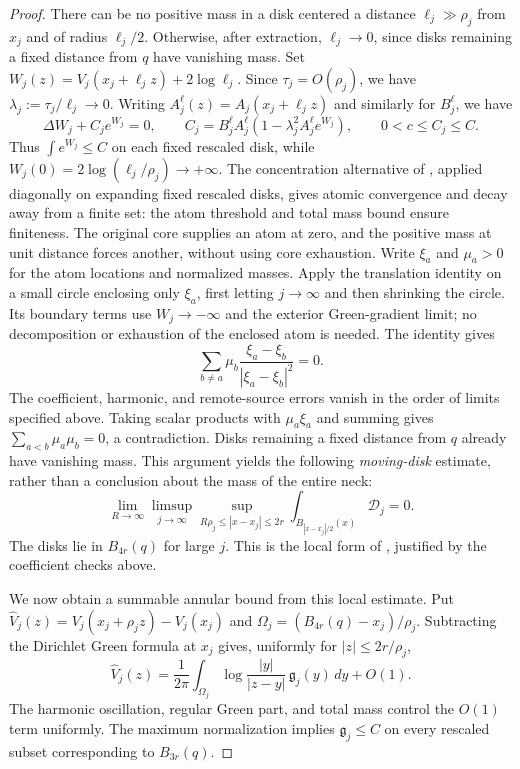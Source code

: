 \documentclass[11pt,reqno]{amsart}
\numberwithin{equation}{section}
\theoremstyle{definition}
\theoremstyle{remark}
\begin{document}
\begin{proof}
There can be no positive mass in a disk centered a distance
$\ell_j\gg\rho_j$ from $x_j$ and of radius $\ell_j/2$.
Otherwise, after extraction, $\ell_j\to0$, since disks remaining
a fixed distance from $q$ have vanishing mass. Set
\(W_j(z)=V_j(x_j+\ell_jz)+2\log\ell_j.\)
Since $\tau_j=O(\rho_j)$, we have $\lambda_j:=\tau_j/\ell_j\to0$.
Writing $A_j^\ell(z)=A_j(x_j+\ell_jz)$ and similarly for $B_j^\ell$, we have
\[
 \Delta W_j+C_je^{W_j}=0,\qquad
 C_j=B_j^\ell A_j^\ell(1-\lambda_j^2A_j^\ell e^{W_j}),
 \qquad 0<c\le C_j\le C.
\]
Thus $\int e^{W_j}\le C$ on each fixed rescaled disk, while
$W_j(0)=2\log(\ell_j/\rho_j)\to+\infty$.
The concentration alternative of \cite[Theorem~3]{BM}, applied
diagonally on expanding fixed rescaled disks, gives atomic convergence
and decay away from a finite set: the atom threshold and total mass
bound ensure finiteness. The original core supplies an atom at zero,
and the positive mass at unit distance forces another, without using
core exhaustion. Write $\xi_a$ and $\mu_a>0$ for the atom locations
and normalized masses. Apply the translation identity on a small
circle enclosing only $\xi_a$, first letting $j\to\infty$ and then
shrinking the circle. Its boundary terms use $W_j\to-\infty$ and
the exterior Green-gradient limit; no decomposition or exhaustion
of the enclosed atom is needed. The identity gives
\[
 \sum_{b\ne a}\mu_b
        \frac{\xi_a-\xi_b}{|\xi_a-\xi_b|^2}=0.
\]
The coefficient, harmonic, and remote-source errors vanish in the
order of limits specified above.
Taking scalar products with $\mu_a\xi_a$ and summing gives
$\sum_{a<b}\mu_a\mu_b=0$, a contradiction. Disks remaining a fixed
distance from $q$ already have vanishing mass. This argument yields
the following \emph{moving-disk} estimate, rather than a conclusion
about the mass of the entire neck:
\begin{equation}\label{eq:regular-moving-disk}
 \lim_{R\to\infty}\limsup_{j\to\infty}
 \sup_{R\rho_j\le |x-x_j|\le2r}
 \int_{B_{|x-x_j|/2}(x)}\mathcal D_j=0.
\end{equation}
The disks lie in $B_{4r}(q)$ for large $j$. This is the local form of
\cite[Lemma~2.7]{LinYanAIHP}, justified by the coefficient checks above.

We now obtain a summable annular bound from this local estimate.
Put $\widehat V_j(z)=V_j(x_j+\rho_jz)-V_j(x_j)$ and
$\Omega_j=(B_{4r}(q)-x_j)/\rho_j$. Subtracting the Dirichlet Green
formula at $x_j$ gives, uniformly for $|z|\le2r/\rho_j$,
\begin{equation}\label{eq:regular-green-difference}
 \widehat V_j(z)=\frac1{2\pi}\int_{\Omega_j}
      \log\frac{|y|}{|z-y|}\,\mathfrak g_j(y)\,dy+O(1).
\end{equation}
The harmonic oscillation, regular Green part, and total mass control
the $O(1)$ term uniformly.
The maximum normalization implies $\mathfrak g_j\le C$ on every
rescaled subset corresponding to $B_{3r}(q)$.


\end{proof}
\end{document}
